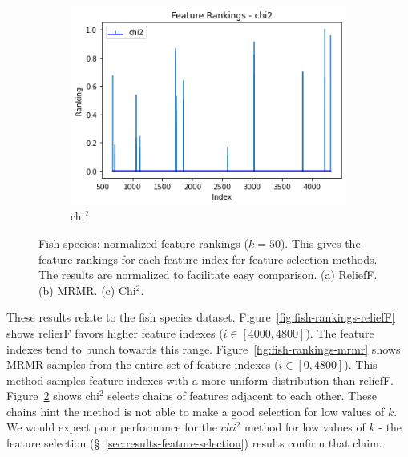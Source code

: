 \documentclass{article}
\begin{document}
\begin{figure}[htb]
  \begin{subfigure}[b]{\linewidth}
    \includegraphics[width=1\linewidth]{fish_rankings_k-50_chi2.png}
    \caption{chi$^2$}
    \label{fig:fish-rankings-chi2}
  \end{subfigure}
  \caption[Two numerical solutions]{
    Fish species: normalized feature rankings ($k=50$).
    This gives the feature rankings for each feature index for feature selection methods.
    The results are normalized to facilitate easy comparison.
    (a) ReliefF. (b) MRMR. (c) Chi$^2$.}
\end{figure}

These results relate to the fish species dataset.
Figure~\ref{fig:fish-rankings-reliefF} shows relierF favors higher feature indexes ($i \in [4000, 4800]$).
The feature indexes tend to bunch towards this range.
Figure~\ref{fig:fish-rankings-mrmr} shows MRMR samples from the entire set of feature indexes ($i \in [0, 4800]$).
This method samples feature indexes with a more uniform distribution than reliefF.
Figure~\ref{fig:fish-rankings-chi2} shows chi$^2$ selects chains of features adjacent to each other.
These chains hint the method is not able to make a good selection for low values of $k$.
We would expect poor performance for the $chi^2$ method for low values of $k$ - the feature selection (\S~\ref{sec:results-feature-selection}) results confirm that claim.
\end{document}
